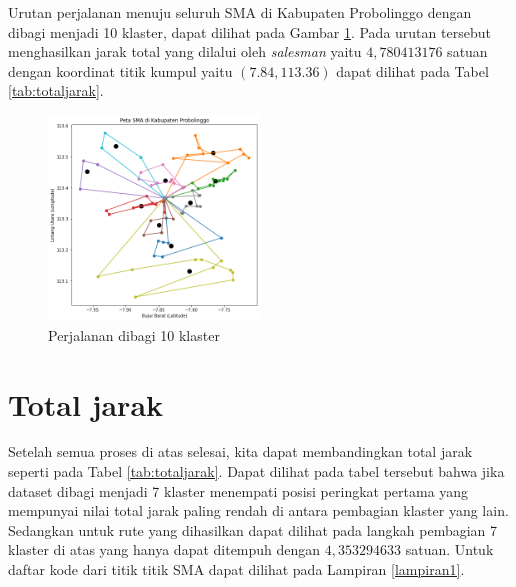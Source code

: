 Urutan perjalanan menuju seluruh SMA di Kabupaten Probolinggo dengan dibagi menjadi 10 klaster, dapat dilihat pada Gambar \ref{fig:hasil_mtsp10}. Pada urutan tersebut menghasilkan jarak total yang dilalui oleh \textit{salesman} yaitu $4,780413176$ satuan dengan koordinat titik kumpul yaitu $(7.84, 113.36)$ dapat dilihat pada Tabel \ref{tab:totaljarak}.

\begin{figure}[H]
\centering
\includegraphics[width=0.5\textwidth]{Gambar/hasil_mtsp/10}
\caption{Perjalanan dibagi 10 klaster}
\label{fig:hasil_mtsp10}
\end{figure}

\section{Total jarak}
Setelah semua proses di atas selesai, kita dapat membandingkan total jarak seperti pada Tabel \ref{tab:totaljarak}. Dapat dilihat pada tabel tersebut bahwa jika dataset dibagi menjadi 7 klaster menempati posisi peringkat pertama yang mempunyai nilai total jarak paling rendah di antara pembagian klaster yang lain. Sedangkan untuk rute yang dihasilkan dapat dilihat pada langkah pembagian 7 klaster di atas yang hanya dapat ditempuh dengan $4,353294633$ satuan. Untuk daftar kode dari titik titik SMA dapat dilihat pada Lampiran \ref{lampiran1}.

